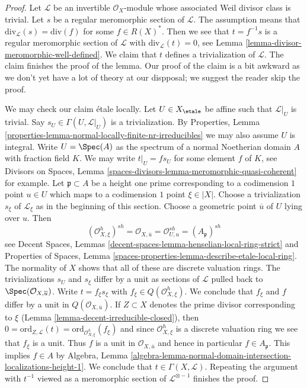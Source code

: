 \begin{proof}
Let $\mathcal{L}$ be an invertible $\mathcal{O}_X$-module whose
associated Weil divisor class is trivial. Let $s$ be a regular
meromorphic section of $\mathcal{L}$. The assumption means that
$\text{div}_\mathcal{L}(s) = \text{div}(f)$ for some
$f \in R(X)^*$. Then we see that $t = f^{-1}s$ is a regular
meromorphic section of $\mathcal{L}$ with
$\text{div}_\mathcal{L}(t) = 0$, see
Lemma \ref{lemma-divisor-meromorphic-well-defined}.
We claim that $t$ defines a trivialization of $\mathcal{L}$.
The claim finishes the proof of the lemma.
Our proof of the claim is a bit awkward as we
don't yet have a lot of theory at our dispposal; we suggest
the reader skip the proof.

\medskip\noindent
We may check our claim \'etale locally. Let $U \in X_\etale$ be affine
such that $\mathcal{L}|_U$ is trivial. Say $s_U \in \Gamma(U, \mathcal{L}|_U)$
is a trivialization. By
Properties, Lemma \ref{properties-lemma-normal-locally-finite-nr-irreducibles}
we may also assume $U$ is integral. Write $U = \Spec(A)$ as the spectrum of a
normal Noetherian domain $A$ with fraction field $K$.
We may write $t|_U = f s_U$ for some element $f$ of $K$, see
Divisors on Spaces, Lemma \ref{spaces-divisors-lemma-meromorphic-quasi-coherent}
for example. Let $\mathfrak p \subset A$ be a height one prime
corresponding to a codimension $1$ point $u \in U$ which maps
to a codimension $1$ point $\xi \in |X|$. Choose a trivialization
$s_\xi$ of $\mathcal{L}_\xi$ as in the beginning of this section.
Choose a geometric point $\overline{u}$ of $U$ lying over $u$.
Then
$$
(\mathcal{O}_{X, \xi}^h)^{sh} =
\mathcal{O}_{X, \overline{u}} =
\mathcal{O}_{U, u}^{sh} = (A_\mathfrak p)^{sh}
$$
see Decent Spaces, Lemmas
\ref{decent-spaces-lemma-henselian-local-ring-strict}
and
Properties of Spaces, Lemma
\ref{spaces-properties-lemma-describe-etale-local-ring}.
The normality of $X$ shows that all of these are
discrete valuation rings. The trivializations $s_U$ and $s_\xi$
differ by a unit as sections of $\mathcal{L}$ pulled back to
$\Spec(\mathcal{O}_{X, \overline{u}})$.
Write $t = f_\xi s_\xi$ with $f_\xi \in Q(\mathcal{O}_{X, \xi}^h)$.
We conclude that $f_\xi$ and $f$ differ by a unit
in $Q(\mathcal{O}_{X, \overline{u}})$.
If $Z \subset X$ denotes the prime divisor corresponding to $\xi$
(Lemma \ref{lemma-decent-irreducible-closed}), then
$0 = \text{ord}_{Z, \mathcal{L}}(t) =
\text{ord}_{\mathcal{O}_{X, \xi}^h}(f_\xi)$
and since $\mathcal{O}_{X, \xi}^h$ is a discrete valuation ring
we see that $f_\xi$ is a unit.
Thus $f$ is a unit in $\mathcal{O}_{X, \overline{u}}$
and hence in particular $f \in A_\mathfrak p$.
This implies $f \in A$ by Algebra, Lemma
\ref{algebra-lemma-normal-domain-intersection-localizations-height-1}.
We conclude that $t \in \Gamma(X, \mathcal{L})$.
Repeating the argument with $t^{-1}$ viewed as a meromorphic
section of $\mathcal{L}^{\otimes -1}$ finishes the proof.
\end{proof}

















